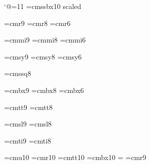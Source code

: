 \catcode`@=11
\font\titlefont=cmssbx10 scaled 

\font\ninerm=cmr9
\font\eightrm=cmr8
\font\sixrm=cmr6

\font\ninei=cmmi9
\font\eighti=cmmi8
\font\sixi=cmmi6

\font\ninesy=cmsy9
\font\eightsy=cmsy8
\font\sixsy=cmsy6

\font\eightss=cmssq8


\font\ninebf=cmbx9
\font\eightbf=cmbx8
\font\sixbf=cmbx6

\font\ninett=cmtt9
\font\eighttt=cmtt8

\font\ninesl=cmsl9
\font\eightsl=cmsl8

\font\nineit=cmti9
\font\eightit=cmti8

\font\tenu=cmu10 %
\font\tenrm=cmr10 %
\font\tentt=cmtt10
\let\oldtenbf=\tenbf
\font\tenbf=cmbx10
\let\mainfont=\tenrm
{}=\tenrm
\let\oldninerm=\ninerm
\font\ninerm=cmr9
\newskip\ttglue
\def\tenpoint{\def\rm{\fam0\tenrm}%
  \textfont0=\tenrm \scriptfont0=\sevenrm \scriptscriptfont0=\fiverm
  \textfont1=\teni \scriptfont1=\seveni \scriptscriptfont1=\fivei
  \textfont2=\tensy \scriptfont2=\sevensy \scriptscriptfont2=\fivesy
  \textfont3=\tenex \scriptfont3=\tenex \scriptscriptfont3=\tenex
  \def\it{\fam\itfam\tenit}%
  \textfont\itfam=\tenit
  \def\sl{\fam\slfam\tensl}%
  \textfont\slfam=\tensl
  \def\bf{\fam\bffam\tenbf}%
  \textfont\bffam=\tenbf \scriptfont\bffam=\sevenbf
   \scriptscriptfont\bffam=\fivebf
  \def\tt{\fam\ttfam\tentt}%
  \textfont\ttfam=\tentt
  \tt \ttglue=.5em plus.25em minus.15em
  \normalbaselineskip=12pt
  \let\sc=\eightrm
  \let\big=\tenbig
  \setbox\strutbox=\hbox{\vrule height8.5pt depth3.5pt width\z@}%
  \normalbaselines\rm}
\def\eightpoint{\def\rm{\fam0\eightrm}%
  \textfont0=\eightrm \scriptfont0=\sixrm \scriptscriptfont0=\fiverm
  \textfont1=\eighti \scriptfont1=\sixi \scriptscriptfont1=\fivei
  \textfont2=\eightsy \scriptfont2=\sixsy \scriptscriptfont2=\fivesy
  \textfont3=\tenex \scriptfont3=\tenex \scriptscriptfont3=\tenex
  \def\it{\fam\itfam\eightit}%
  \textfont\itfam=\eightit
  \def\sl{\fam\slfam\eightsl}%
  \textfont\slfam=\eightsl
  \def\bf{\fam\bffam\eightbf}%
  \textfont\bffam=\eightbf \scriptfont\bffam=\sixbf
   \scriptscriptfont\bffam=\fivebf
  \def\tt{\fam\ttfam\eighttt}%
  \textfont\ttfam=\eighttt
  \tt \ttglue=.5em plus.25em minus.15em
  \normalbaselineskip=9pt
  \let\sc=\sixrm
  \let\big=\eightbig
  \setbox\strutbox=\hbox{\vrule height7pt depth2pt width\z@}%
  \normalbaselines\rm}
